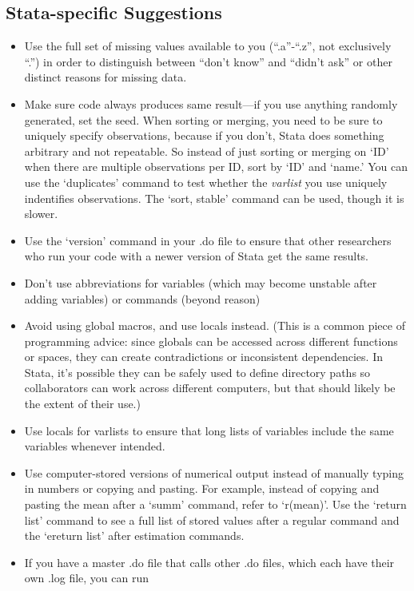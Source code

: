 \documentclass[12pt] {article}
\begin{document}
\subsection{Stata-specific
Suggestions}\label{stata-specific-suggestions}

\begin{itemize}
\item
  Use the full set of missing values available to you (``.a''-``.z'', not exclusively
  ``.'') in order to distinguish between ``don't know'' and ``didn't ask'' or other distinct reasons for missing data.
\item
  Make sure code always produces same result---if you use anything randomly generated, set the seed. When sorting or merging, you need to be sure to uniquely specify observations, because if you don't, Stata does something arbitrary and not repeatable. So instead of just sorting or merging on `ID' when there are multiple observations per ID, sort by `ID' and `name.' You can use the `duplicates' command to test whether the \textit{varlist} you use uniquely indentifies observations. The `sort, stable' command can be used, though it is slower.
\item
  Use the `version' command in your .do file to ensure that other researchers who run your code with a newer version of Stata get the same results. 
\item
  Don't use abbreviations for variables (which may become unstable after
  adding variables) or commands (beyond reason)
\item
  Avoid using global macros, and use locals instead. (This is a common piece of programming advice: since globals can be accessed across different functions or spaces, they can create contradictions or inconsistent dependencies. In Stata, it's possible they can be safely used to define directory paths so collaborators can work across different computers, but that should likely be the extent of their use.)
\item
  Use locals for varlists to ensure that long lists of variables include the same variables whenever intended.
\item
  Use computer-stored versions of numerical output instead of manually typing in numbers or copying and pasting. For example, instead of copying and pasting the mean after a `summ' command, refer to `r(mean)'. Use the `return list' command to see a full list of stored values after a regular command and the `ereturn list' after estimation commands.
\item
  If you have a master .do file that calls other .do files, which each have their own .log file, you can run

\end{itemize}
\end{document}
